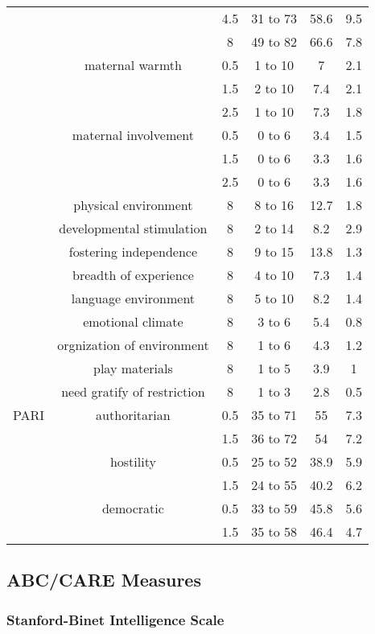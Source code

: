 \begin{ThreePartTable}
\begin{longtable}{c c c c c c}
        & & 4.5 & 31 to 73 & 58.6 & 9.5 \\
        & & 8 & 49 to 82 & 66.6 & 7.8 \\
        & maternal warmth & 0.5 & 1 to 10 & 7 & 2.1 \\
        & & 1.5 & 2 to 10 & 7.4 & 2.1 \\
        & & 2.5 & 1 to 10 & 7.3 & 1.8 \\
        & maternal involvement & 0.5 & 0 to 6 & 3.4 & 1.5 \\
        & & 1.5 & 0 to 6 & 3.3 & 1.6 \\
        & & 2.5 & 0 to 6 & 3.3 & 1.6 \\
        & physical environment & 8 & 8 to 16 & 12.7 & 1.8 \\
        & developmental stimulation & 8 & 2 to 14 & 8.2 & 2.9 \\
        & fostering independence & 8 & 9 to 15 & 13.8 & 1.3 \\
        & breadth of experience & 8 & 4 to 10 & 7.3 & 1.4 \\
        & language environment & 8 & 5 to 10 & 8.2 & 1.4 \\
        & emotional climate & 8 & 3 to 6 & 5.4 & 0.8 \\
        & orgnization of environment & 8 & 1 to 6 & 4.3 & 1.2 \\
        & play materials & 8 & 1 to 5 & 3.9 & 1 \\
        & need gratify of restriction & 8 & 1 to 3 & 2.8 & 0.5 \\
      \midrule
        PARI & authoritarian & 0.5 & 35 to 71 & 55 & 7.3\\
        & & 1.5 & 36 to 72 & 54& 7.2 \\
        & hostility & 0.5 & 25 to 52 & 38.9 & 5.9 \\
        & & 1.5 & 24 to 55 & 40.2 & 6.2 \\
        & democratic & 0.5 & 33 to 59 & 45.8& 5.6\\
        & & 1.5 & 35 to 58 & 46.4 & 4.7 \\
  \end{longtable}
\end{ThreePartTable}

\subsection{ABC/CARE Measures}

  \subsubsection{Stanford-Binet Intelligence Scale}

